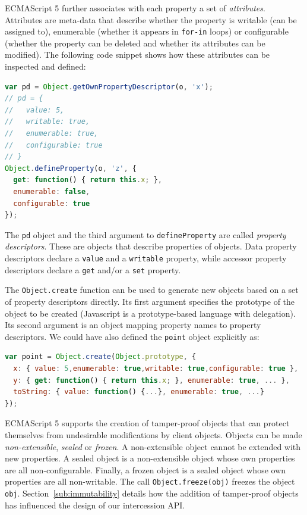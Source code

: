 \documentclass{sig-alternate}
\begin{document}
ECMAScript 5 further associates with each property a set of \emph{attributes}. Attributes are meta-data that describe whether the property is writable (can be assigned to), enumerable (whether it appears in \texttt{for-in} loops) or configurable (whether the property can be deleted and whether its attributes can be modified). The following code snippet shows how these attributes can be inspected and defined:

\begin{lstlisting}[language=javascript]
var pd = Object.getOwnPropertyDescriptor(o, 'x');
// pd = {
//   value: 5,
//   writable: true,
//   enumerable: true,
//   configurable: true 
// }
Object.defineProperty(o, 'z', {
  get: function() { return this.x; },
  enumerable: false,
  configurable: true
});
\end{lstlisting}

The \texttt{pd} object and the third argument to \texttt{defineProperty} are called \emph{property descriptors}. These are objects that describe properties of objects. Data property descriptors declare a \texttt{value} and a \texttt{writable} property, while accessor property descriptors declare a \texttt{get} and/or a \texttt{set} property.

The \texttt{Object.create} function can be used to generate new objects based on a set of property descriptors directly. Its first argument specifies the prototype of the object to be created (Javascript is a prototype-based language with delegation). Its second argument is an object mapping property names to property descriptors. We could have also defined the \texttt{point} object explicitly as:

\begin{lstlisting}[language=javascript]
var point = Object.create(Object.prototype, {
  x: { value: 5,enumerable: true,writable: true,configurable: true },
  y: { get: function() { return this.x; }, enumerable: true, ... },
  toString: { value: function() {...}, enumerable: true, ...}
});
\end{lstlisting}

ECMAScript 5 supports the creation of tamper-proof objects that can protect themselves from undesirable modifications by client objects. Objects can be made \emph{non-extensible}, \emph{sealed} or \emph{frozen}. A non-extensible object cannot be extended with new properties. A sealed object is a non-extensible object whose own properties are all non-configurable. Finally, a frozen object is a sealed object whose own properties are all non-writable. The call \texttt{Object.freeze(obj)} freezes the object \texttt{obj}. Section~\ref{sub:immutability} details how the addition of tamper-proof objects has influenced the design of our intercession API.
\end{document}
